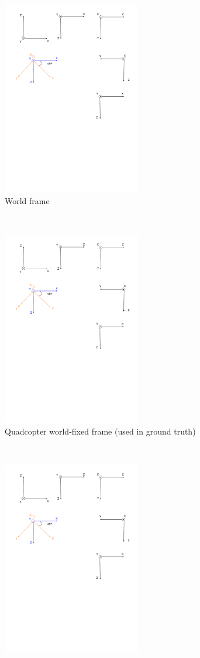 \documentclass[12pt,a4paper]{article}
\begin{document}
    \begin{figure}[p]
      \begin{subfigure}[t]{0.5\textwidth}
      \centering %
        \includegraphics[width=60mm, trim = 20mm 235mm 135mm 10mm, clip]{frames/frames.pdf}
        \caption{World frame}
      \end{subfigure} %
      ~
      \begin{subfigure}[t]{0.5\textwidth}
      \centering
        \includegraphics[width=60mm, trim = 78mm 240mm 78mm 10mm, clip]{frames/frames.pdf}
        \caption{Quadcopter world-fixed frame (used in ground truth)}
      \end{subfigure} %
      \\
      \begin{subfigure}[t]{0.5\textwidth}
      \centering
        \includegraphics[width=60mm, trim = 20mm 235mm 135mm 10mm, clip]{frames/frames.pdf}

\end{subfigure}
\end{figure}
\end{document}
